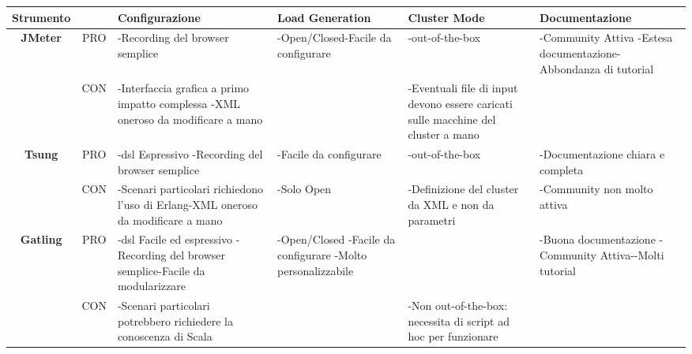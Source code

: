 \begin{table}[H]
\def\arraystretch{2}
\begin{center}
	\begin{tabular}{|c|c|p{3cm}|p{3cm}|p{3cm}|p{3cm}|}
		\hline
		\textbf{Strumento} & & \textbf{Configurazione} & \textbf{Load Generation} & \textbf{Cluster Mode} & \textbf{Documentazione}\\ \hline
		
		\textbf{JMeter} & PRO & -Recording del browser semplice & -Open/Closed\newline-Facile da configurare & -\gls{out-of-the-box} & -Community Attiva \newline -Estesa documentazione\newline-Abbondanza di tutorial \\ \hline
		& CON & -Interfaccia grafica a primo impatto complessa \newline -XML oneroso da modificare a mano & & -Eventuali file di input devono essere caricati sulle macchine del cluster a mano &  \\ \hline\hline
		
		\textbf{Tsung} & PRO & -\gls{dsl} Espressivo \newline-Recording del browser semplice & -Facile da configurare & -\gls{out-of-the-box} & -Documentazione chiara e completa \\ \hline
		& CON & -Scenari particolari richiedono l'uso di Erlang\newline -XML oneroso da modificare a mano & -Solo Open & -Definizione del cluster da XML e non da parametri & -Community non molto attiva  \\ \hline\hline
		
		\textbf{Gatling} & PRO & -\gls{dsl} Facile ed espressivo \newline-Recording del browser semplice\newline-Facile da modularizzare & -Open/Closed  \newline -Facile da configurare \newline -Molto personalizzabile &  & -Buona documentazione \newline-Community Attiva-\newline-Molti tutorial \\ \hline
		& CON & -Scenari particolari potrebbero richiedere la conoscenza di Scala &  & -Non \gls{out-of-the-box}: necessita di script ad hoc per funzionare &   \\ \hline\hline
		

\end{tabular}
\end{center}
\end{table}
